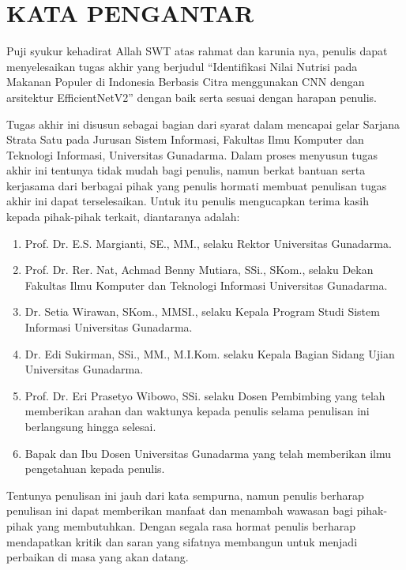 \chapter*{KATA PENGANTAR}

Puji syukur kehadirat Allah SWT atas rahmat dan karunia nya, penulis dapat menyelesaikan tugas akhir yang berjudul “Identifikasi Nilai Nutrisi pada Makanan Populer di Indonesia Berbasis Citra menggunakan CNN dengan arsitektur EfficientNetV2” dengan baik serta sesuai dengan harapan penulis.

Tugas akhir ini disusun sebagai bagian dari syarat dalam mencapai gelar Sarjana Strata Satu pada Jurusan Sistem Informasi, Fakultas Ilmu Komputer dan Teknologi Informasi, Universitas Gunadarma. Dalam proses menyusun tugas akhir ini tentunya tidak mudah bagi penulis, namun berkat bantuan serta kerjasama dari berbagai pihak yang penulis hormati membuat penulisan tugas akhir ini dapat terselesaikan. Untuk itu penulis mengucapkan terima kasih kepada pihak-pihak terkait, diantaranya adalah:

\begin{enumerate}
    \item Prof. Dr. E.S. Margianti, SE., MM., selaku Rektor Universitas Gunadarma.
    \item Prof. Dr. Rer. Nat, Achmad Benny Mutiara, SSi., SKom., selaku Dekan Fakultas Ilmu Komputer dan Teknologi Informasi Universitas Gunadarma.
    \item Dr. Setia Wirawan, SKom., MMSI., selaku Kepala Program Studi Sistem Informasi Universitas Gunadarma.
    \item Dr. Edi Sukirman, SSi., MM., M.I.Kom. selaku Kepala Bagian Sidang Ujian Universitas Gunadarma.
    \item Prof. Dr. Eri Prasetyo Wibowo, SSi. selaku Dosen Pembimbing yang telah memberikan arahan dan waktunya kepada penulis selama penulisan ini berlangsung hingga selesai.
    \item Bapak dan Ibu Dosen Universitas Gunadarma yang telah memberikan ilmu pengetahuan kepada penulis.
\end{enumerate}

Tentunya penulisan ini jauh dari kata sempurna, namun penulis berharap penulisan ini dapat memberikan manfaat dan menambah wawasan bagi pihak-pihak yang membutuhkan. Dengan segala rasa hormat penulis berharap mendapatkan kritik dan saran yang sifatnya membangun untuk menjadi perbaikan di masa yang akan datang.

